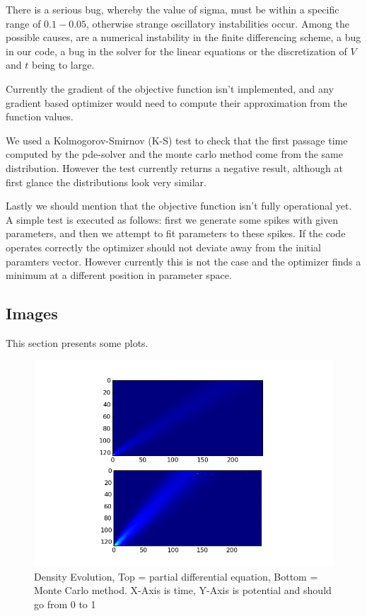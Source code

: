\documentclass[10pt]{article}
\begin{document}
There is a serious bug, whereby the value of sigma,
must be within a specific range of $0.1 - 0.05$, otherwise strange
oscillatory instabilities occur. Among the possible causes, are a
numerical instability in the finite differencing scheme, a bug in our
code, a bug in the solver for the linear equations or the
discretization of $V$ and $t$ being to large. 

Currently the gradient of the objective function isn't implemented,
and any gradient based optimizer would need to compute their
approximation from the function values. 

We used a Kolmogorov-Smirnov (K-S) test to check that the first
passage time computed by the pde-solver and the monte carlo method
come from the same distribution. However the test currently returns a
negative result, although at first glance the distributions look very
similar. 

Lastly we should mention that the objective function isn't fully
operational yet. A simple test is executed as follows: first we
generate some spikes with given parameters, and then we attempt to fit
parameters to these spikes. If the code operates correctly the
optimizer should not deviate away from the initial paramters vector.
However currently this is not the case and the optimizer finds a
minimum at a different position in parameter space.

\subsection{Images}

This section presents some plots.

\begin{figure}[htp]
\centering
\includegraphics[scale=0.60]{P_vt}
\caption{Density Evolution, Top = partial differential equation,
Bottom = Monte Carlo method. X-Axis is time, Y-Axis is potential and
should go from 0 to 1}
\label{P_vt}
\end{figure}
\end{document}

